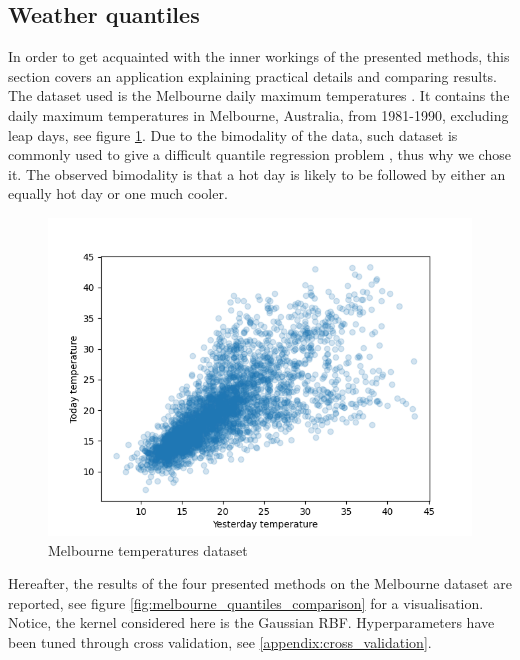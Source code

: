 \subsection{Weather quantiles}
In order to get acquainted with the inner workings of the presented methods, this section covers an application explaining practical details and comparing results.
\\
The dataset used is the Melbourne daily maximum temperatures . It contains the daily maximum temperatures in Melbourne, Australia, from 1981-1990, excluding leap days, see figure \ref{fig:melbourne_temperature_data}.
Due to the bimodality of the data, such dataset is commonly used to give a difficult quantile regression problem \cite{hyndman1996estimating}, thus why we chose it. The observed bimodality is that a hot day is likely to be followed by either an equally hot day or one much cooler.
\begin{figure}[!h]
    \includegraphics[width=\textwidth]{images/melbourne_temperature.png}
    \caption{Melbourne temperatures dataset}
    \label{fig:melbourne_temperature_data}
\end{figure}
Hereafter, the results of the four presented methods on the Melbourne dataset are reported, see figure \ref{fig:melbourne_quantiles_comparison} for a visualisation. Notice, the kernel considered here is the Gaussian RBF. Hyperparameters have been tuned through cross validation, see \ref{appendix:cross_validation}.
